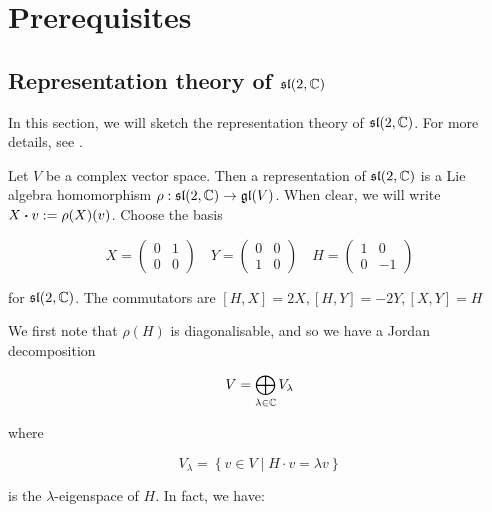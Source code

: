 \documentclass{report}
\renewcommand{\sl}{\mathfrak{sl}}
\begin{document}


\appendix

\chapter{Prerequisites}

\section{Representation theory of \(\sl(2, \C)\)}

In this section, we will sketch the representation theory of \(\sl(2, \C)\). For more details, see \cite[Section 7]{humphreys}.

Let \(V\) be a complex vector space. Then a representation of \(\sl(2, \C)\) is a Lie algebra homomorphism \(\rho : \sl(2, \C) \to \gl(V)\). When clear, we will write \(X \vdot v := \rho(X)(v)\). Choose the basis

\[X = \begin{pmatrix}
    0 & 1 \\
    0 & 0
\end{pmatrix} \quad Y = \begin{pmatrix}
    0 & 0 \\
    1 & 0
\end{pmatrix} \quad H = \begin{pmatrix}
    1 & 0 \\
    0 & -1
\end{pmatrix}\]

for \(\sl(2, \C)\). The commutators are \([H, X] = 2X, [H, Y] = -2Y, [X,Y] = H\)

We first note that \(\rho(H)\) is diagonalisable, and so we have a Jordan decomposition

\[V = \bigoplus_{\lambda \in \mathbb{C}}V_\lambda\]

where

\[V_\lambda = \left\{v \in V \mid H \cdot v = \lambda v\right\}\]

is the \(\lambda\)-eigenspace of \(H\). In fact, we have:
\end{document}
